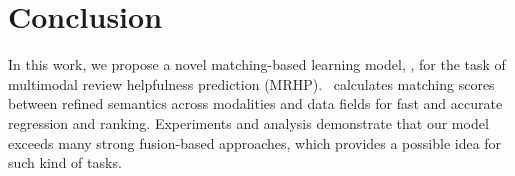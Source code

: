 \section{Conclusion}
In this work, we propose a novel matching-based learning  model, \modelname, for the task of multimodal review helpfulness prediction (MRHP).
\modelname~calculates matching scores between refined semantics across modalities and data fields for fast and accurate regression and ranking.
Experiments and analysis demonstrate that our model exceeds many strong fusion-based approaches, which provides a possible idea for such kind of tasks.